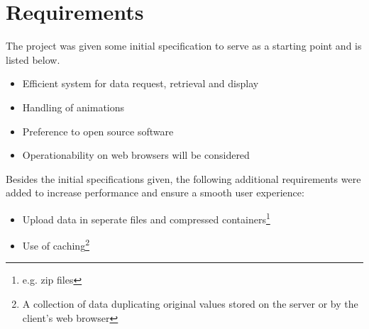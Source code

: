 \chapter{Requirements}
\label{sec:requirements}
The project was given some initial specification to serve as a starting point and is listed below.
\begin{itemize}
\item Efficient system for data request, retrieval and display
\item Handling of animations
\item Preference to open source software 
\item Operationability on web browsers will be considered
\end{itemize}

Besides the initial specifications given, the following additional requirements were added to increase performance and ensure a smooth user experience:
\begin{itemize}
\item Upload data in seperate files and compressed containers\footnote{e.g. zip files}
\item Use of caching\footnote{A collection of data duplicating original values stored on the server or by the client's web browser}
\end{itemize}
